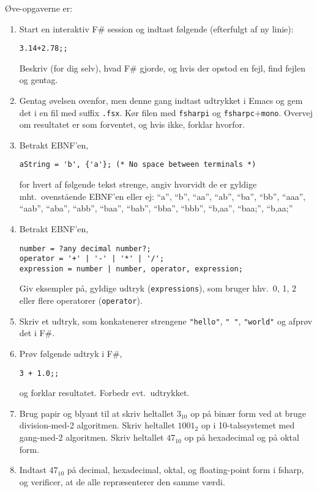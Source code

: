 \documentclass[a4paper,12pt]{article}
\begin{document}
Øve-opgaverne er:
\begin{enumerate}[label=2ø.\arabic*,start=0]
\item Start en interaktiv F\# session og indtast følgende (efterfulgt af ny linie):
\begin{lstlisting}
3.14+2.78;;
\end{lstlisting}
Beskriv (for dig selv), hvad F\# gjorde, og hvis der opstod en fejl, find fejlen og gentag.
\item Gentag øvelsen ovenfor, men denne gang indtast udtrykket i Emacs og gem det i en fil med suffix \verb|.fsx|. Kør filen med \lstinline[language=console]{fsharpi} og \lstinline[language=console]{fsharpc}+\lstinline[language=console]{mono}. Overvej om resultatet er som forventet, og hvis ikke, forklar hvorfor.
\item Betrakt EBNF'en,
\begin{lstlisting}[language=ebnf]
aString = 'b', {'a'}; (* No space between terminals *)
\end{lstlisting}
for hvert af følgende tekst strenge, angiv hvorvidt de er gyldige mht.\ ovenstående EBNF'en eller ej: "`a"', "`b"', "`aa"', "`ab"', "`ba"', "`bb"', "`aaa"', "`aab"', "`aba"', "`abb"', "`baa"', "`bab"', "`bba"', "`bbb"', "`b,aa"', "`baa;"', "`b,aa;"'
\item Betrakt EBNF'en,
\begin{lstlisting}[language=ebnf]
number = ?any decimal number?;
operator = '+' | '-' | '*' | '/';
expression = number | number, operator, expression;
\end{lstlisting}
Giv eksempler på,  gyldige udtryk (\lstinline[language=ebnf]{expressions}), som bruger hhv.\ 0, 1, 2 eller flere operatorer (\lstinline[language=ebnf]{operator}).
\item Skriv et udtryk, som konkatenerer strengene \lstinline{"hello"}, \lstinline{" "}, \lstinline{"world"} og afprøv det i F\#.
\item Prøv følgende udtryk i F\#,
\begin{lstlisting}
3 + 1.0;;
\end{lstlisting}
og forklar resultatet. Forbedr evt.\ udtrykket.
\item Brug papir og blyant til at skriv heltallet $3_{10}$ op på binær form ved at bruge division-med-2 algoritmen. Skriv heltallet $1001_2$ op i 10-talssystemet med gang-med-2 algoritmen. Skriv heltallet $47_{10}$ op på hexadecimal og på oktal form.
\item Indtast $47_{10}$ på decimal, hexadecimal, oktal, og floating-point form i fsharp, og verificer, at de alle repræsenterer den samme værdi.

\end{enumerate}
\end{document}
